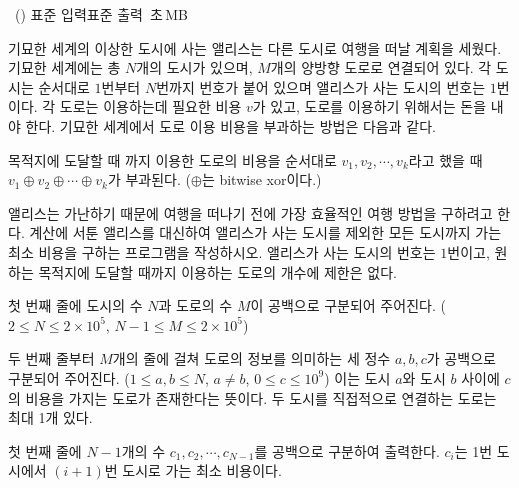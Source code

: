 \begin{problem}{\kcpcprobtrip\ (\kcpcprobtripshort)}
    {표준 입력}{표준 출력}
    {\kcpcprobtriptime\,초}{\kcpcprobtripmemory\,MB}{}
    
    기묘한 세계의 이상한 도시에 사는 앨리스는 다른 도시로 여행을 떠날 계획을 세웠다. 기묘한 세계에는 총 $N$개의 도시가 있으며, $M$개의 양방향 도로로 연결되어 있다. 각 도시는 순서대로 $1$번부터 $N$번까지 번호가 붙어 있으며 앨리스가 사는 도시의 번호는 $1$번이다. 각 도로는 이용하는데 필요한 비용 $v$가 있고, 도로를 이용하기 위해서는 돈을 내야 한다. 기묘한 세계에서 도로 이용 비용을 부과하는 방법은 다음과 같다.
    
    목적지에 도달할 때 까지 이용한 도로의 비용을 순서대로 $v_{1}, v_{2}, \cdots, v_{k}$라고 했을 때 $v_{1} \oplus v_{2} \oplus \cdots \oplus v_{k}$가 부과된다. ($\oplus$는 bitwise xor이다.)
    
    앨리스는 가난하기 때문에 여행을 떠나기 전에 가장 효율적인 여행 방법을 구하려고 한다. 계산에 서툰 앨리스를 대신하여 앨리스가 사는 도시를 제외한 모든 도시까지 가는 최소 비용을 구하는 프로그램을 작성하시오. 앨리스가 사는 도시의 번호는 $1$번이고, 원하는 목적지에 도달할 때까지 이용하는 도로의 개수에 제한은 없다.
   
    \InputFile
    첫 번째 줄에 도시의 수 $N$과 도로의 수 $M$이 공백으로 구분되어 주어진다. ($2 \le N \le 2 \times 10^5$, $N-1 \le M \le 2 \times 10^5$)
    
    두 번째 줄부터 $M$개의 줄에 걸쳐 도로의 정보를 의미하는 세 정수 $a, b, c$가 공백으로 구분되어 주어진다. ($1 \le a, b \le N$, $a \neq b$, $0 \le c \le 10^9$)
    이는 도시 $a$와 도시 $b$ 사이에 $c$의 비용을 가지는 도로가 존재한다는 뜻이다. 두 도시를 직접적으로 연결하는 도로는 최대 1개 있다.
    
    \OutputFile
    첫 번째 줄에 $N-1$개의 수 $c_1, c_2, \cdots, c_{N-1}$를 공백으로 구분하여 출력한다. $c_i$는 1번 도시에서  $(i+1)$번 도시로 가는 최소 비용이다.
    
    \Examples
    \begin{example}
    \end{example}
    
\end{problem}

